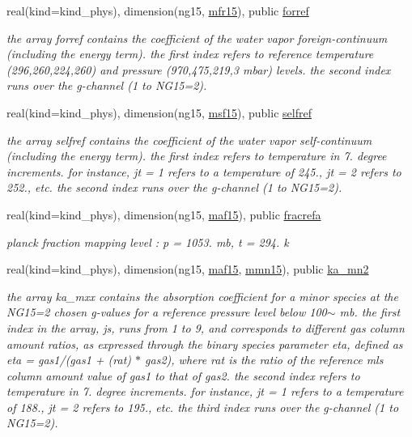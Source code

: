 \begin{Indent}
\begin{DoxyCompactItemize}
real(kind=kind\+\_\+phys), dimension(ng15, \hyperlink{group__module__radlw__kgbnn_gad4d78009d0c7ffa27dbb228e68307675}{mfr15}), public \hyperlink{group__module__radlw__kgbnn_gada70146d20f89f059141aa4cf58a0894}{forref}
\begin{DoxyCompactList}\small\item\em the array forref contains the coefficient of the water vapor foreign-\/continuum (including the energy term). the first index refers to reference temperature (296,260,224,260) and pressure (970,475,219,3 mbar) levels. the second index runs over the g-\/channel (1 to N\+G15=2). \end{DoxyCompactList}\item 
real(kind=kind\+\_\+phys), dimension(ng15, \hyperlink{group__module__radlw__kgbnn_gae1b588ee60974c2d451c89f842601e07}{msf15}), public \hyperlink{group__module__radlw__kgbnn_ga1d14e9b2e607f2022d84c6fc0cd27c4e}{selfref}
\begin{DoxyCompactList}\small\item\em the array selfref contains the coefficient of the water vapor self-\/continuum (including the energy term). the first index refers to temperature in 7. degree increments. for instance, jt = 1 refers to a temperature of 245., jt = 2 refers to 252., etc. the second index runs over the g-\/channel (1 to N\+G15=2). \end{DoxyCompactList}\item 
real(kind=kind\+\_\+phys), dimension(ng15, \hyperlink{group__module__radlw__kgbnn_ga482858cf08fb1a14117dfbaa6a57fe8c}{maf15}), public \hyperlink{group__module__radlw__kgbnn_ga4b5c5f6fd9ea806843adf78ec1b43cd2}{fracrefa}
\begin{DoxyCompactList}\small\item\em planck fraction mapping level \+: p = 1053. mb, t = 294. k \end{DoxyCompactList}\item 
real(kind=kind\+\_\+phys), dimension(ng15, \hyperlink{group__module__radlw__kgbnn_ga482858cf08fb1a14117dfbaa6a57fe8c}{maf15}, \hyperlink{group__module__radlw__kgbnn_ga8ab45999cfc7b9db0f3d3b61ccf803e8}{mmn15}), public \hyperlink{group__module__radlw__kgbnn_gaff32d89fe8fef50ff79136cc7aa50526}{ka\+\_\+mn2}
\begin{DoxyCompactList}\small\item\em the array ka\+\_\+mxx contains the absorption coefficient for a minor species at the N\+G15=2 chosen g-\/values for a reference pressure level below 100$\sim$ mb. the first index in the array, js, runs from 1 to 9, and corresponds to different gas column amount ratios, as expressed through the binary species parameter eta, defined as eta = gas1/(gas1 + (rat) $\ast$ gas2), where rat is the ratio of the reference mls column amount value of gas1 to that of gas2. the second index refers to temperature in 7. degree increments. for instance, jt = 1 refers to a temperature of 188., jt = 2 refers to 195., etc. the third index runs over the g-\/channel (1 to N\+G15=2). \end{DoxyCompactList}\end{DoxyCompactItemize}
\end{Indent}
